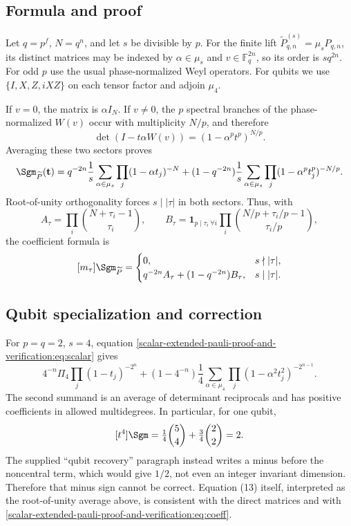 \documentclass[10pt]{article}
\begin{document}
\subsection{Formula and proof}
Let $q=p^f$, $N=q^n$, and let $s$ be divisible by $p$.  For the finite lift
$\widetilde P_{q,n}^{(s)}=\mu_sP_{q,n}$, its distinct matrices may be indexed
by $\alpha\in\mu_s$ and $v\in\mathbb F_q^{2n}$, so its order is $sq^{2n}$.
For odd $p$ use the usual phase-normalized Weyl operators.  For qubits we use
$\{I,X,Z,iXZ\}$ on each tensor factor and adjoin $\mu_4$.

If $v=0$, the matrix is $\alpha I_N$.  If $v\ne0$, the $p$ spectral branches
of the phase-normalized $W(v)$ occur with multiplicity $N/p$, and therefore
\[
\det(I-t\alpha W(v))=(1-\alpha^p t^p)^{N/p}.
\]
Averaging these two sectors proves
\begin{equation}\label{scalar-extended-pauli-proof-and-verification:eq:scalar}
\Sgm_{\widetilde P}(\mathbf t)=
q^{-2n}\frac1s\sum_{\alpha\in\mu_s}\prod_j(1-\alpha t_j)^{-N}
+(1-q^{-2n})\frac1s\sum_{\alpha\in\mu_s}
\prod_j(1-\alpha^pt_j^p)^{-N/p}.
\end{equation}
Root-of-unity orthogonality forces $s\mid|\tau|$ in both sectors.  Thus,
with
\[
A_\tau=\prod_i\binom{N+\tau_i-1}{\tau_i},\qquad
B_\tau=\mathbf1_{p\mid\tau_i\ \forall i}
\prod_i\binom{N/p+\tau_i/p-1}{\tau_i/p},
\]
the coefficient formula is
\begin{equation}\label{scalar-extended-pauli-proof-and-verification:eq:coeff}
[m_\tau]\Sgm_{\widetilde P}=\begin{cases}
0,&s\nmid|\tau|,\\
q^{-2n}A_\tau+(1-q^{-2n})B_\tau,&s\mid|\tau|.
\end{cases}
\end{equation}

\subsection{Qubit specialization and correction}
For $p=q=2$, $s=4$, equation \eqref{scalar-extended-pauli-proof-and-verification:eq:scalar} gives
\[
4^{-n}\Pi_4\prod_j(1-t_j)^{-2^n}
+(1-4^{-n})\frac14\sum_{\alpha\in\mu_4}
\prod_j(1-\alpha^2t_j^2)^{-2^{n-1}}.
\]
The second summand is an average of determinant reciprocals and has positive
coefficients in allowed multidegrees.  In particular, for one qubit,
\[
[t^4]\Sgm=\tfrac14\binom{5}{4}+\tfrac34\binom{2}{2}=2.
\]
The supplied “qubit recovery” paragraph instead writes a minus before the
noncentral term, which would give $1/2$, not even an integer invariant
dimension.  Therefore that minus sign cannot be correct.  Equation (13)
itself, interpreted as the root-of-unity average above, is consistent with
the direct matrices and with \eqref{scalar-extended-pauli-proof-and-verification:eq:coeff}.
\end{document}
